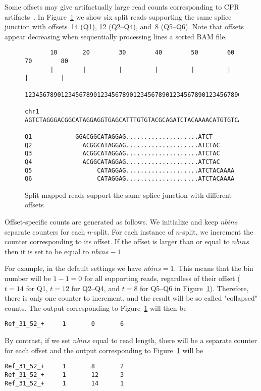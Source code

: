 \documentclass{article}
\begin{document}
Some offsets may give artifactually large read counts corresponding to CPR artifacts~\cite{pmid22537040}. 
In Figure~\ref{fig::02} we show six split reads supporting the same splice junction with offsets~14 (Q1), 
12 (Q2--Q4), and~8 (Q5--Q6). Note that offsets appear decreasing when sequentially processing lines a sorted 
BAM file.
%
\begin{figure}[h]
\footnotesize
\begin{verbatim}
       10       20        30        40        50        60        70        80
       |        |         |         |         |         |         |         |
       123456789012345678901234567890123456789012345678901234567890123456789012

chr1   AGTCTAGGGACGGCATAGGAGGTGAGCATTTGTGTACGCAGATCTACAAAACATGTGTCACGGATAGGATCG

Q1            GGACGGCATAGGAG....................ATCT      
Q2              ACGGCATAGGAG....................ATCTAC    
Q3              ACGGCATAGGAG....................ATCTAC    
Q4              ACGGCATAGGAG....................ATCTAC    
Q5                  CATAGGAG....................ATCTACAAAA
Q6                  CATAGGAG....................ATCTACAAAA
\end{verbatim}
\caption{Split-mapped reads support the same splice junction with different offsets\label{fig::02}}
\end{figure}

Offset-specific counts are generated as follows. We initialize and keep $nbins$ separate counters
for each $n$-split. For each instance of $n$-split, we increment the counter corresponding to its 
offset. If the offset is larger than or equal to $nbins$ then it is  set to be equal to $nbins-1$.

For example, in the default settings we have $nbins=1$. This means that the bin number will be $1-1=0$ 
for all supporting reads, regardless of their offset ($t=14$ for Q1, $t=12$ for Q2--Q4, and $t=8$ for 
Q5--Q6 in Figure~\ref{fig::02}). Therefore, there is only one counter to increment, and the result will 
be so called "collapsed" counts. The output corresponding to Figure~\ref{fig::02} will then be
\begin{verbatim}
Ref_31_52_+     1       0       6
\end{verbatim}

By contrast, if we set $nbins$ equal to read length, there will be a separate counter for each offset 
and the output corresponding to Figure~\ref{fig::02} will be
\begin{verbatim}
Ref_31_52_+     1       8       2
Ref_31_52_+     1       12      3
Ref_31_52_+     1       14      1
\end{verbatim}
\end{document}
